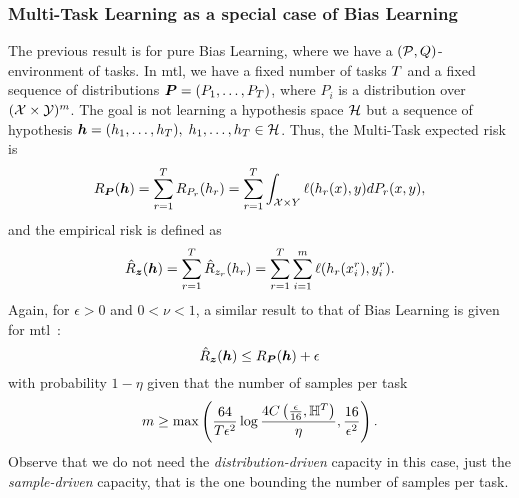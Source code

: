 \subsubsection*{Multi-Task Learning as a special case of Bias Learning}
The previous result is for pure Bias Learning, where we have a $(\mathcal{P}, Q)$-environment of tasks. In \acrshort{mtl}, we have a fixed number of tasks $T$ and a fixed sequence of distributions $\bm{P} = (P_1, \ldots, P_T)$, where $P_i$ is a distribution over $(\mathcal{X} \times \mathcal{Y})^m$. The goal is not learning a hypothesis space $\mathcal{H}$ but a sequence of hypothesis $\bm{h} = (h_1, \ldots, h_T),\; h_1, \ldots, h_T \in \mathcal{H} $. Thus, the Multi-Task expected risk is
\begin{equation}\label{eq:mtlearn_exprisk}
    \risk_{\bprobseq}(\myvec{\hypf}) = \sum_{r=1}^\ntasks \risk_{P_r}(\hypf_r)  = \sum_{r=1}^\ntasks \int_{\Xspace \times Y} \lossf(\hypf_r(x), y) d{P_r}(x, y),
\end{equation}
and the empirical risk is defined as
\begin{equation}\label{eq:mtlearn_emprisk}
    \bemprisk(\myvec{\hypf}) = \sum_{r=1}^\ntasks \hat{\risk}_{\sample_r}(\hypf_r) = \sum_{r=1}^\ntasks \sum_{i=1}^m \lossf(\hypf_r(x_i^r), y_i^r).
\end{equation}
Again, for $\epsilon > 0$ and $0 < \nu < 1$, a similar result to that of Bias Learning is given for \acrshort{mtl}~\cite[Theorem~4]{baxter2000model}:
\begin{equation}
    \nonumber
    \hat{R}_{\bm{z}}(\bm{h}) \leq R_{\bm{P}}(\bm{h}) + \epsilon
\end{equation}
with probability $1 - \eta$ given that the number of samples per task
\begin{equation}
    \nonumber
    m \geq \max \left( \frac{64}{T \epsilon^2} \log\frac{4C\left(\frac{\epsilon}{16}, \mathbb{H}^{T}\right)}{\eta} , \frac{16}{\epsilon^2}\right).
\end{equation}
Observe that we do not need the \emph{distribution-driven} capacity in this case, just the \emph{sample-driven} capacity, that is the one bounding the number of samples per task.
